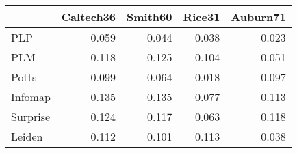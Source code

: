 \begin{tabular}{lrrrr}
\toprule
{} & Caltech36 & Smith60 & Rice31 & Auburn71 \\
\midrule
PLP      &     0.059 &   0.044 &  0.038 &    0.023 \\
PLM      &     0.118 &   0.125 &  0.104 &    0.051 \\
Potts    &     0.099 &   0.064 &  0.018 &    0.097 \\
Infomap  &     0.135 &   0.135 &  0.077 &    0.113 \\
Surprise &     0.124 &   0.117 &  0.063 &    0.118 \\
Leiden   &     0.112 &   0.101 &  0.113 &    0.038 \\
\bottomrule
\end{tabular}
